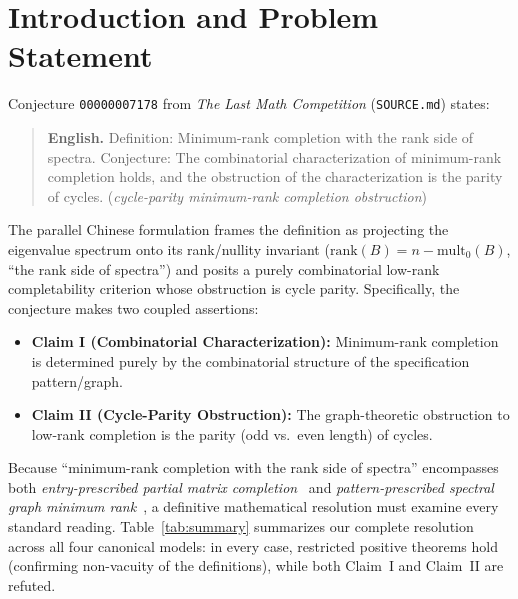 \documentclass[11pt]{article}
\theoremstyle{definition}
\newcommand{\rk}{\mathrm{rank}}
\begin{document}
\section{Introduction and Problem Statement}

Conjecture \texttt{00000007178} from \emph{The Last Math Competition} (\texttt{SOURCE.md}) states:

\begin{quote}
\textbf{English.} Definition: Minimum-rank completion with the rank side of spectra. Conjecture: The combinatorial characterization of minimum-rank completion holds, and the obstruction of the characterization is the parity of cycles. (\emph{cycle-parity minimum-rank completion obstruction})
\end{quote}

\noindent The parallel Chinese formulation frames the definition as projecting the eigenvalue spectrum onto its rank/nullity invariant ($\rk(B) = n - \mathrm{mult}_0(B)$, ``the rank side of spectra'') and posits a purely combinatorial low-rank completability criterion whose obstruction is cycle parity. Specifically, the conjecture makes two coupled assertions:
\begin{itemize}
\item \textbf{Claim I (Combinatorial Characterization):} Minimum-rank completion is determined purely by the combinatorial structure of the specification pattern/graph.
\item \textbf{Claim II (Cycle-Parity Obstruction):} The graph-theoretic obstruction to low-rank completion is the parity (odd vs.\ even length) of cycles.
\end{itemize}

Because ``minimum-rank completion with the rank side of spectra'' encompasses both \emph{entry-prescribed partial matrix completion}~\cite{CJRW1989,GJSw1984,Laurent2001} and \emph{pattern-prescribed spectral graph minimum rank}~\cite{Haemers1979,Peeters1996,BF2004,FH2007}, a definitive mathematical resolution must examine every standard reading. Table~\ref{tab:summary} summarizes our complete resolution across all four canonical models: in every case, restricted positive theorems hold (confirming non-vacuity of the definitions), while both Claim~I and Claim~II are refuted.
\end{document}

